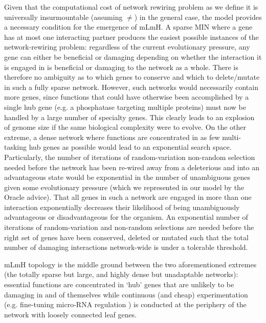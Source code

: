     Given that the computational cost of network rewiring problem as we define it is universally insurmountable (assuming $\neq$) in the general case, the model provides a necessary condition for the emergence of mLmH. A sparse MIN where a gene has at most one interacting partner produces the easiest possible instances of the network-rewiring problem: regardless of the current evolutionary pressure, any gene can either be beneficial or damaging depending on whether the interaction it is engaged in is beneficial or damaging to the network as a whole. There is therefore no ambiguity as to which genes to conserve and which to delete/mutate in such a fully sparse network. However, such networks would necessarily contain more genes, since  functions that could have otherwise been accomplished by a single hub gene (e.g. a phosphatase targeting multiple proteins) must now be handled by a large number of specialty genes. This clearly leads to an explosion of genome size if the same biological complexity were to evolve. On the other extreme, a dense network where functions are concentrated in as few  multi-tasking hub genes as possible would lead to an exponential search space. Particularly, the number of iterations of random-variation non-random selection needed before the network has been re-wired  away from a deleterious and into an advantageous state would be exponential in the number of unambiguous genes given some evolutionary pressure (which we represented in our model by the Oracle advice). That all genes in such a network are engaged in more than one interaction exponentially decreases their likelihood of being unambiguously advantageous or disadvantageous for the organism. An exponential number of iterations of random-variation and non-random selections are needed before the right set of genes have been conserved, deleted or mutated such that the total number of damaging interactions network-wide is under a tolerable threshold.

    mLmH topology is the middle ground between the two aforementioned extremes (the totally sparse but large, and highly dense but unadaptable networks): essential functions are concentrated \cite{gerstein_architecture_2012} in `hub' genes that are unlikely to be damaging in and of themselves \cite{khurana_interpretation_2013}  while continuous (and cheap) experimentation (e.g. fine-tuning micro-RNA regulation \cite{gerstein_architecture_2012}) is conducted at the periphery of the network \cite{kim_positive_2007} with loosely connected leaf genes.


